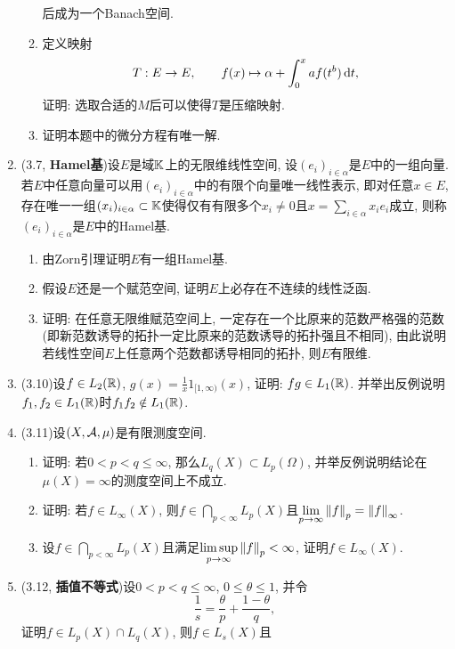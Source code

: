 \begin{enumerate}[label=\textbf{\arabic*.}, ref=\arabic*]
\begin{enumerate}[(1)]
\[        \]
        后成为一个Banach空间.
        \item 定义映射
        \[
        T : E\to E,\qquad f(x)\mapsto\alpha+\int_0^x af(t^b)\,\mathrm{d} t,
        \]
        证明: 选取合适的$ M $后可以使得$ T $是压缩映射.
        \item 证明本题中的微分方程有唯一解.
        \end{enumerate}
    \item (3.7, \textbf{Hamel基})设$ E $是域$ \mathbb{K} $上的无限维线性空间, 设$ (e_i)_{i\in\alpha} $是$ E $中的一组向量. 若$ E $中任意向量可以用$ (e_i)_{i\in\alpha} $中的有限个向量唯一线性表示, 即对任意$ x\in E $, 存在唯一一组$ (x_i)_{i\in\alpha}\subset\mathbb{K} $使得仅有有限多个$ x_i\ne 0 $且$ x=\sum\limits_{i\in\alpha}x_ie_i $成立, 则称$ (e_i)_{i\in\alpha} $是$ E $中的Hamel基.
        \begin{enumerate}[(1)]
        \item 由Zorn引理证明$ E $有一组Hamel基.
        \item 假设$ E $还是一个赋范空间, 证明$ E $上必存在不连续的线性泛函.
        \item 证明: 在任意无限维赋范空间上, 一定存在一个比原来的范数严格强的范数(即新范数诱导的拓扑一定比原来的范数诱导的拓扑强且不相同), 由此说明若线性空间$ E $上任意两个范数都诱导相同的拓扑, 则$ E $有限维.
        \end{enumerate}
    \item (3.10)设$ f\in L_2(\mathbb{R}) $, $ g(x)=\frac{1}{x}1_{[1,\infty)}(x) $, 证明: $ fg\in L_1(\mathbb{R}) $. 并举出反例说明$ f_1,f_2\in L_1(\mathbb{R}) $时$ f_1f_2\notin L_1(\mathbb{R}) $.
    \item (3.11)设$ (X,\mathcal{A}, \mu) $是有限测度空间.
        \begin{enumerate}[(1)]
        \item 证明: 若$ 0<p<q\leqslant\infty $, 那么$ L_q(X)\subset L_p(\varOmega) $, 并举反例说明结论在$ \mu(X)=\infty $的测度空间上不成立.
        \item 证明: 若$ f\in L_\infty(X) $, 则$ f\in\bigcap_{p<\infty}L_p(X) $且$ \lim\limits_{p\to\infty}\left\| f \right\|_p=\left\| f \right\|_\infty $.
        \item 设$ f\in\bigcap_{p<\infty}L_p(X) $且满足$ \limsup\limits_{p\to\infty}\left\| f \right\|_p<\infty $, 证明$ f\in L_\infty(X) $.
        \end{enumerate}
    \item (3.12, \textbf{插值不等式})设$ 0<p<q\leqslant\infty $, $ 0\leqslant\theta\leqslant 1 $, 并令
        \[
        \frac{1}{s}=\frac{\theta}{p}+\frac{1-\theta}{q},
        \]
        证明$ f\in L_p(X)\cap L_q(X) $, 则$ f\in L_s(X) $且

\end{enumerate}
